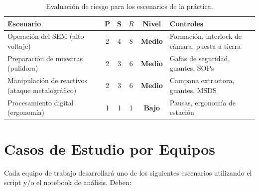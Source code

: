 \documentclass[12pt,a4paper]{article}
\begin{document}
\begin{table}[H]
	\centering
	\caption{Evaluación de riesgo para los escenarios de la práctica.}
	\label{tab:riesgo_base}
	\small
	\begin{tabularx}{\textwidth}{l c c c c X}
		\toprule
		\textbf{Escenario} & \textbf{P}                                      & \textbf{S} & \textbf{$R$}
		                   & \textbf{Nivel}
		                   & \textbf{Controles}                                                          \\
		\midrule
		\rowcolor{aeroyellow!15}
		Operación del SEM (alto voltaje)
		                   & 2                                               & 4          & 8
		                   & \textcolor{aeroyellow!80!black}{\textbf{Medio}}
		                   & Formación, interlock de cámara, puesta a tierra                             \\
		\rowcolor{aerogreen!10}
		Preparación de muestras (pulidora)
		                   & 2                                               & 3          & 6
		                   & \textcolor{aeroyellow!80!black}{\textbf{Medio}}
		                   & Gafas de seguridad, guantes, SOPs                                           \\
		\rowcolor{aerogreen!10}
		Manipulación de reactivos (ataque metalográfico)
		                   & 2                                               & 3          & 6
		                   & \textcolor{aeroyellow!80!black}{\textbf{Medio}}
		                   & Campana extractora, guantes, MSDS                                           \\
		\rowcolor{aerogreen!10}
		Procesamiento digital (ergonomía)
		                   & 1                                               & 1          & 1
		                   & \textcolor{aerogreen}{\textbf{Bajo}}
		                   & Pausas, ergonomía de estación                                               \\
		\bottomrule
	\end{tabularx}
\end{table}

\section{Casos de Estudio por Equipos}
\label{sec:equipos}

Cada equipo de trabajo desarrollará uno de los siguientes escenarios
utilizando el script y/o el notebook de análisis.  Deben:
\end{document}
